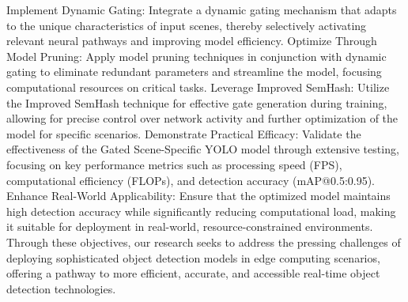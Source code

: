 Implement Dynamic Gating: Integrate a dynamic gating mechanism that adapts to the unique characteristics of input scenes, thereby selectively activating relevant neural pathways and improving model efficiency.
Optimize Through Model Pruning: Apply model pruning techniques in conjunction with dynamic gating to eliminate redundant parameters and streamline the model, focusing computational resources on critical tasks.
Leverage Improved SemHash: Utilize the Improved SemHash technique for effective gate generation during training, allowing for precise control over network activity and further optimization of the model for specific scenarios.
Demonstrate Practical Efficacy: Validate the effectiveness of the Gated Scene-Specific YOLO model through extensive testing, focusing on key performance metrics such as processing speed (FPS), computational efficiency (FLOPs), and detection accuracy (mAP@0.5:0.95).
Enhance Real-World Applicability: Ensure that the optimized model maintains high detection accuracy while significantly reducing computational load, making it suitable for deployment in real-world, resource-constrained environments.
Through these objectives, our research seeks to address the pressing challenges of deploying sophisticated object detection models in edge computing scenarios, offering a pathway to more efficient, accurate, and accessible real-time object detection technologies.

\clearpage


